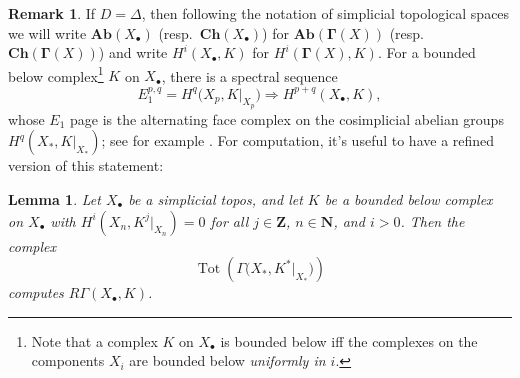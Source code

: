 \documentclass[11pt]{amsart}
\newtheorem{Lemma}[Thm]{Lemma}
\theoremstyle{definition}
\newtheorem{Rmk}[Thm]{Remark}
\newcommand{\Tot}{\operatorname{Tot}}
\newcommand{\Ra}{\Rightarrow}
\newcommand{\Ab}{\mathbf{Ab}}
\newcommand{\Ch}{\mathbf{Ch}}
\begin{document}
\begin{Rmk}\label{Rmk simplicial notation}
If $D = \Delta$, then following the notation of simplicial
topological spaces we will write $\Ab(X_\bullet)$ (resp.\
$\Ch(X_\bullet)$) for $\Ab(\mathbf \Gamma(X))$ (resp.\ $\Ch(\mathbf
\Gamma(X))$) and write $H^i(X_\bullet, K)$ for $H^i(\mathbf
\Gamma(X),K)$. For a bounded below complex\footnote{Note that a
complex $K$ on $X_\bullet$ is bounded below iff the complexes on the
components $X_i$ are bounded below \emph{uniformly in $i$}.} $K$ on
$X_\bullet$, there is a spectral sequence
\[
E_1^{p,q} = H^q\big(X_p,K|_{X_p}\big) \Ra H^{p+q}(X_\bullet,K),
\]
whose $E_1$ page is the alternating face complex on the cosimplicial
abelian groups $H^q(X_*,K|_{X_*})$; see for example
\cite[exp.~V$^{\text{bis}}$,~cor.~2.3.7 and~2.3.9]{SGA4II}. For
computation, it's useful to have a refined version of this
statement:
\end{Rmk}

\begin{Lemma}\label{Lem componentwise acyclic}
Let $X_\bullet$ be a simplicial topos, and let $K$ be a bounded
below complex on $X_\bullet$ with $H^i(X_n, K^j|_{X_n}) = 0$
for all $j \in \mathbf Z$, $n \in \mathbf N$, and $i > 0$. Then the
complex
\[
\Tot\left(\Gamma\big(X_*, K^*\big|_{X_*} \big)\right)
\]
computes $R\Gamma(X_\bullet,K)$.
\end{Lemma}
\end{document}
